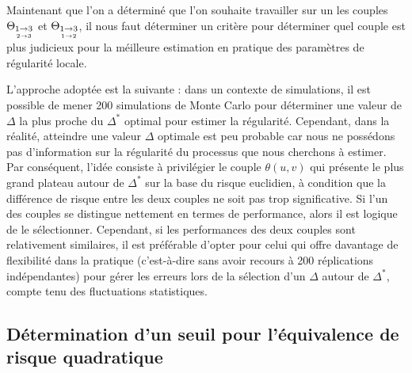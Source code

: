 
Maintenant que l'on a déterminé que l'on souhaite travailler sur un les couples $\Theta_{\underset{2 \rightarrow 3}{1 \rightarrow 3}}$ et $\Theta_{\underset{1 \rightarrow 2}{1 \rightarrow 3}}$, il nous faut déterminer un critère pour déterminer quel couple est plus judicieux pour la méilleure estimation en pratique des paramètres de régularité locale.

L'approche adoptée est la suivante : dans un contexte de simulations, il est possible de mener 200 simulations de Monte Carlo pour déterminer une valeur de $\Delta$ la plus proche du $\Delta^*$ optimal pour estimer la régularité. Cependant, dans la réalité, atteindre une valeur $\Delta$ optimale est peu probable car nous ne possédons pas d'information sur la régularité du processus que nous cherchons à estimer. Par conséquent, l'idée consiste à privilégier le couple $\theta(u,v)$ qui présente le plus grand plateau autour de $\Delta^*$ sur la base du risque euclidien, à condition que la différence de risque entre les deux couples ne soit pas trop significative. Si l'un des couples se distingue nettement en termes de performance, alors il est logique de le sélectionner. Cependant, si les performances des deux couples sont relativement similaires, il est préférable d'opter pour celui qui offre davantage de flexibilité dans la pratique (c'est-à-dire sans avoir recours à 200 réplications indépendantes) pour gérer les erreurs lors de la sélection d'un $\Delta$ autour de $\Delta^*$, compte tenu des fluctuations statistiques.

\subsection{Détermination d'un seuil pour l'équivalence de risque quadratique}

